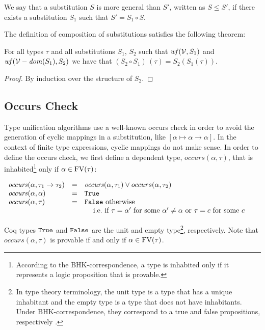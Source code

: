 We say that a substitution $S$ is more general than $S'$, written as
$S\leq S'$, if there exists a substitution $S_1$ such that $S' = S_1
\circ S$.

The definition of composition of substitutions satisfies the following
theorem:

\begin{Theorem}
For all types $\tau$ and all substitutions $S_1$, $S_2$ such that
$\text{\it wf\/}(\mathcal{V},S_1)$ and $\text{\it wf\/}(\mathcal{V}-\text{\it dom\/}(S_1),S_2)$ we have that $(S_2 \circ
S_1)\,(\tau) = S_2 (S_1 (\tau))$.
\end{Theorem}
\begin{proof}
By induction over the structure of $S_2$.
\end{proof}

\subsection{Occurs Check}

\newcommand{\occurs}{\text{\it occurs\/}}

Type unification algorithms use a well-known occurs check in order to
avoid the generation of cyclic mappings in a substitution, like
$[\alpha\mapsto\alpha\to\alpha]$. In the context of finite type
expressions, cyclic mappings do not make sense. In order to define the
occurs check, we first define a dependent type, $occurs(\alpha,\tau)$,
that is inhabited\footnote{According to the BHK-correspondence, a type
  is inhabited only if it represents a logic proposition that is
  provable.} only if $\alpha\in\text{FV}(\tau)$:

\[ \begin{array}{llp{.7\textwidth}}
      \occurs (\alpha,\tau_1\to\tau_2) & = & $\occurs(\alpha,\tau_1) \lor occurs(\alpha,\tau_2)$ \\
      \occurs (\alpha,\alpha)         & = & $\True$ \\
      \occurs (\alpha, \tau)          & = & $\False$ otherwise\\
                                      &   & $\:\:\:\:$ i.e.~if $\tau = \alpha'$ for some $\alpha'\neq\alpha$ or $\tau = c$ for some $c$
  \end{array}
\]

Coq types $\text{\tt True}$ and $\text{\tt False}$ are the unit and empty type\footnote{In
  type theory terminology, the unit type is a type that has a unique
  inhabitant and the empty type is a type that does not have
  inhabitants. Under BHK-correspondence, they correspond to a true and
  false propositions, respectively \cite{CurryHoward06}.},
respectively. Note that $occurs(\alpha,\tau)$ is provable if and only
if $\alpha \in \text{FV}(\tau)$.

